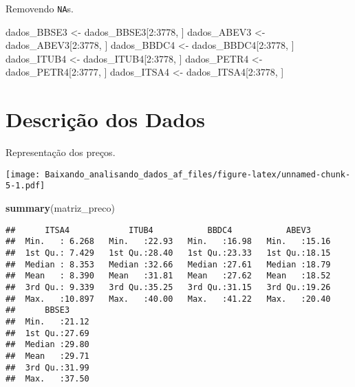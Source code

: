 \documentclass[]{article}
\newenvironment{Shaded}{\begin{snugshade}}{\end{snugshade}}
\newcommand{\KeywordTok}[1]{\textcolor[rgb]{0.13,0.29,0.53}{\textbf{{#1}}}}
\newcommand{\DataTypeTok}[1]{\textcolor[rgb]{0.13,0.29,0.53}{{#1}}}
\newcommand{\DecValTok}[1]{\textcolor[rgb]{0.00,0.00,0.81}{{#1}}}
\newcommand{\StringTok}[1]{\textcolor[rgb]{0.31,0.60,0.02}{{#1}}}
\newcommand{\NormalTok}[1]{{#1}}
\begin{document}
Removendo \texttt{NA}s.

\begin{Shaded}
\begin{Highlighting}[]
\NormalTok{dados_BBSE3 <-}\StringTok{ }\NormalTok{dados_BBSE3[}\DecValTok{2}\NormalTok{:}\DecValTok{3778}\NormalTok{, ]}
\NormalTok{dados_ABEV3 <-}\StringTok{ }\NormalTok{dados_ABEV3[}\DecValTok{2}\NormalTok{:}\DecValTok{3778}\NormalTok{, ]}
\NormalTok{dados_BBDC4 <-}\StringTok{ }\NormalTok{dados_BBDC4[}\DecValTok{2}\NormalTok{:}\DecValTok{3778}\NormalTok{, ]}
\NormalTok{dados_ITUB4 <-}\StringTok{ }\NormalTok{dados_ITUB4[}\DecValTok{2}\NormalTok{:}\DecValTok{3778}\NormalTok{, ]}
\NormalTok{dados_PETR4 <-}\StringTok{ }\NormalTok{dados_PETR4[}\DecValTok{2}\NormalTok{:}\DecValTok{3777}\NormalTok{, ]}
\NormalTok{dados_ITSA4 <-}\StringTok{ }\NormalTok{dados_ITSA4[}\DecValTok{2}\NormalTok{:}\DecValTok{3778}\NormalTok{, ]}
\end{Highlighting}
\end{Shaded}

\section{Descrição dos Dados}\label{descricao-dos-dados}

Representação dos preços.

\begin{Shaded}
\end{Shaded}

\texttt{[image: Baixando\_analisando\_dados\_af\_files/figure-latex/unnamed-chunk-5-1.pdf]}

\begin{Shaded}
\begin{Highlighting}[]
\KeywordTok{summary}\NormalTok{(matriz_preco)}
\end{Highlighting}
\end{Shaded}

\begin{verbatim}
##      ITSA4            ITUB4           BBDC4           ABEV3      
##  Min.   : 6.268   Min.   :22.93   Min.   :16.98   Min.   :15.16  
##  1st Qu.: 7.429   1st Qu.:28.40   1st Qu.:23.33   1st Qu.:18.15  
##  Median : 8.353   Median :32.66   Median :27.61   Median :18.79  
##  Mean   : 8.390   Mean   :31.81   Mean   :27.62   Mean   :18.52  
##  3rd Qu.: 9.339   3rd Qu.:35.25   3rd Qu.:31.15   3rd Qu.:19.26  
##  Max.   :10.897   Max.   :40.00   Max.   :41.22   Max.   :20.40  
##      BBSE3      
##  Min.   :21.12  
##  1st Qu.:27.69  
##  Median :29.80  
##  Mean   :29.71  
##  3rd Qu.:31.99  
##  Max.   :37.50
\end{verbatim}
\end{document}
